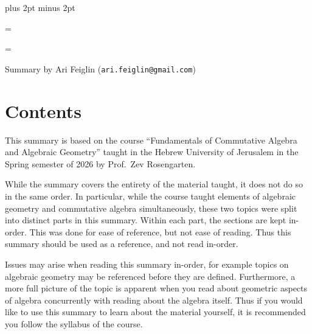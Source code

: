 




\parindent=0pt
\parskip=3pt plus 2pt minus 2pt



\footline={}


\headline={}


{\def\boxshadowcolor{rgb{.7 .7 .5}}

    \smallskip
    \centerline{Summary by Ari Feiglin ({\tt ari.feiglin@gmail.com})}

\eppbox

\bigskip

    \section*{Contents}
    
    \tableofcontents
\eppbox

\vfill\break

\null\vfill


    This summary is based on the course ``Fundamentals of Commutative Algebra and Algebraic Geometry'' taught in the Hebrew University of Jerusalem in the Spring semester
    of 2026 by Prof.\ Zev Rosengarten.

    While the summary covers the entirety of the material taught, it does not do so in the same order.
    In particular, while the course taught elements of algebraic geometry and commutative algebra simultaneously, these two topics were split into distinct parts in this summary.
    Within each part, the sections are kept in-order.
    This was done for ease of reference, but not ease of reading.
    Thus this summary should be used as a reference, and not read in-order.

    Issues may arise when reading this summary in-order, for example topics on algebraic geometry may be referenced before they are defined.
    Furthermore, a more full picture of the topic is apparent when you read about geometric aspects of algebra concurrently with reading about the algebra itself.
    Thus if you would like to use this summary to learn about the material yourself, it is recommended you follow the syllabus of the course.

}

